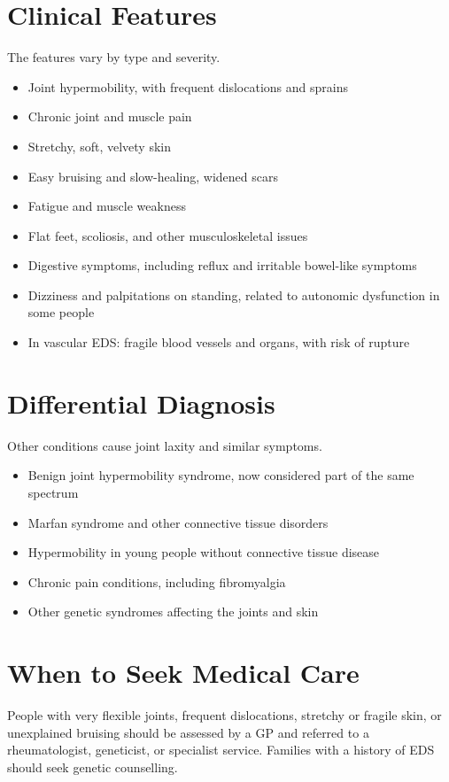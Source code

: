 \section*{Clinical Features}
The features vary by type and severity.
\begin{itemize}
    \item Joint hypermobility, with frequent dislocations and sprains
    \item Chronic joint and muscle pain
    \item Stretchy, soft, velvety skin
    \item Easy bruising and slow-healing, widened scars
    \item Fatigue and muscle weakness
    \item Flat feet, scoliosis, and other musculoskeletal issues
    \item Digestive symptoms, including reflux and irritable bowel-like symptoms
    \item Dizziness and palpitations on standing, related to autonomic dysfunction in some people
    \item In vascular EDS: fragile blood vessels and organs, with risk of rupture
\end{itemize}

\section*{Differential Diagnosis}
Other conditions cause joint laxity and similar symptoms.
\begin{itemize}
    \item Benign joint hypermobility syndrome, now considered part of the same spectrum
    \item Marfan syndrome and other connective tissue disorders
    \item Hypermobility in young people without connective tissue disease
    \item Chronic pain conditions, including fibromyalgia
    \item Other genetic syndromes affecting the joints and skin
\end{itemize}

\section*{When to Seek Medical Care}
People with very flexible joints, frequent dislocations, stretchy or fragile skin, or unexplained bruising should be assessed by a GP and referred to a rheumatologist, geneticist, or specialist service. Families with a history of EDS should seek genetic counselling.

